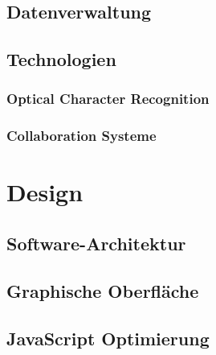 \documentclass[a4paper,12pt,twoside,openany]{book}
\begin{document}
\newpage

\subsection{Datenverwaltung}
\label{subsec:sota_daten}


\newpage

\subsection{Technologien}
\label{subsec:technologien}

\subsubsection{Optical Character Recognition}
\label{subsubsec:sota_ocr}

\newpage
\subsubsection{Collaboration Systeme}
\label{subsubsec:sota_pws}


\newpage %

\section{Design}
\label{sec:design}


\subsection{Software-Architektur}
\label{subsec:softwarearchitektur}


\newpage

\subsection{Graphische Oberfläche}
\label{subsec:graphischeoberflaeche}


\newpage

\subsection{JavaScript Optimierung}
\label{subsec:javascriptoptimierung}

\end{document}

